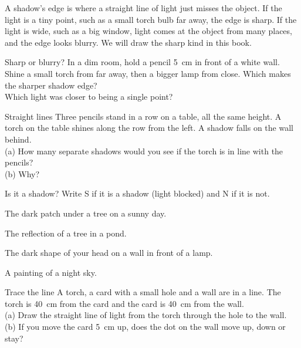 \clearpage

A shadow's edge is where a straight line of light just misses the object. If the light is a tiny point, such as a small torch bulb far away, the edge is sharp. If the light is wide, such as a big window, light comes at the object from many places, and the edge looks blurry. We will draw the sharp kind in this book.

\begin{tryit}{Sharp or blurry?}
In a dim room, hold a pencil 5~cm in front of a white wall. Shine a small torch from far away, then a bigger lamp from close. Which makes the sharper shadow edge? \wline[3cm]\\
Which light was closer to being a single point? \wline[3cm]
\end{tryit}

\begin{puzzle}{Straight lines}
Three pencils stand in a row on a table, all the same height. A torch on the table shines along the row from the left. A shadow falls on the wall behind.\\
(a) How many separate shadows would you see if the torch is in line with the pencils? \wline[1.2cm]\\
(b) Why? \wline[5cm]
\end{puzzle}

\begin{puzzle}{Is it a shadow?}
Write S if it is a shadow (light blocked) and N if it is not.
\begin{description}[leftmargin=1.6em,itemsep=0.3em,style=sameline]
\item[(a)] The dark patch under a tree on a sunny day. \wline[1cm]
\item[(b)] The reflection of a tree in a pond. \wline[1cm]
\item[(c)] The dark shape of your head on a wall in front of a lamp. \wline[1cm]
\item[(d)] A painting of a night sky. \wline[1cm]
\end{description}
\end{puzzle}

\begin{puzzle}{Trace the line}
A torch, a card with a small hole and a wall are in a line. The torch is 40~cm from the card and the card is 40~cm from the wall.\\
(a) Draw the straight line of light from the torch through the hole to the wall. \\
(b) If you move the card 5~cm up, does the dot on the wall move up, down or stay? \wline[2cm]
\begin{center}
\end{center}
\end{puzzle}

